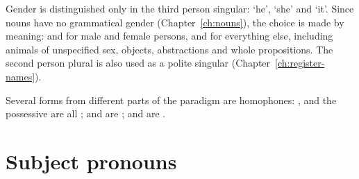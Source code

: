 Gender is distinguished only in the third person singular:  `he',  `she' and  `it'. Since nouns have no grammatical gender (Chapter~\ref{ch:nouns}), the choice is made by meaning:  and  for male and female persons, and  for everything else, including animals of unspecified sex, objects, abstractions and whole propositions. The second person plural  is also used as a polite singular (Chapter~\ref{ch:register-names}).

Several forms from different parts of the paradigm are homophones: ,  and the possessive  are all ;  and  are ;  and  are .

\section{Subject pronouns}\label{sec:subject-pronouns}

